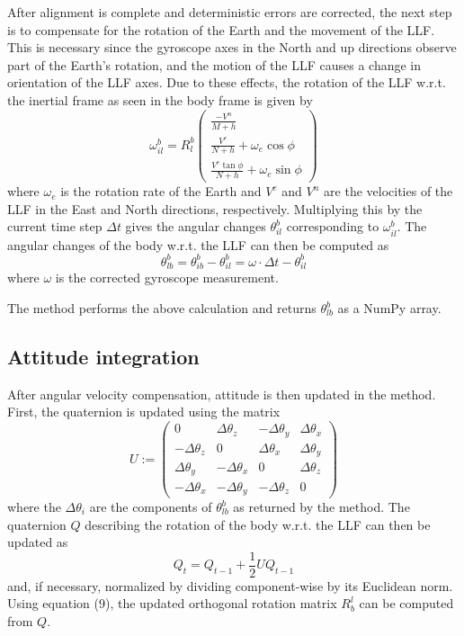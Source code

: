 \documentclass[11pt, oneside]{article}   	%
\begin{document}
After alignment is complete and deterministic errors are corrected, the next step is to compensate for the rotation of the Earth and the movement of the LLF.  This is necessary since the gyroscope axes in the North and up directions observe part of the Earth's rotation, and the motion of the LLF causes a change in orientation of the LLF axes.  Due to these effects, the rotation of the LLF w.r.t. the inertial frame as seen in the body frame is given by 
\begin{equation}
\omega_{il}^b=R_l^b\begin{pmatrix}
\frac{-V^n}{M+h} \\[.1cm]
\frac{V^e}{N+h}+\omega_e \cos\phi \\[.1cm]
\frac{V^e\tan\phi}{N+h}+\omega_e \sin\phi
\end{pmatrix}
\end{equation}
where $\omega_e$ is the rotation rate of the Earth and $V^e$ and $V^n$ are the velocities of the LLF in the East and North directions, respectively.  Multiplying this by the current time step $\Delta t$ gives the angular changes $\theta_{il}^b$ corresponding to $\omega_{il}^b$.  The angular changes of the body w.r.t. the LLF can then be computed as 
\begin{equation}
\theta_{lb}^b=\theta_{ib}^b-\theta_{il}^b=\omega\cdot\Delta t-\theta_{il}^b
\end{equation}
where $\omega$ is the corrected gyroscope measurement.

The  method performs the above calculation and returns $\theta_{lb}^b$ as a NumPy array.

\subsection{Attitude integration}
After angular velocity compensation, attitude is then updated in the  method. First, the quaternion is updated using the matrix
\begin{equation}
U:=\begin{pmatrix}
0 & \Delta\theta_z & -\Delta\theta_y & \Delta\theta_x \\
-\Delta\theta_z & 0 & \Delta\theta_x & \Delta\theta_y \\
\Delta\theta_y & -\Delta\theta_x & 0 & \Delta\theta_z \\
-\Delta\theta_x & -\Delta\theta_y & -\Delta\theta_z & 0 
\end{pmatrix}
\end{equation}
where the $\Delta\theta_i$ are the components of $\theta_{lb}^b$ as returned by the  method.  The quaternion $Q$ describing the rotation of the body w.r.t. the LLF can then be updated as
\begin{equation}
Q_t=Q_{t-1}+\frac12UQ_{t-1}
\end{equation}
and, if necessary, normalized by dividing component-wise by its Euclidean norm. Using equation (9), the updated orthogonal rotation matrix $R_b^l$ can be computed from $Q$.
\end{document}
